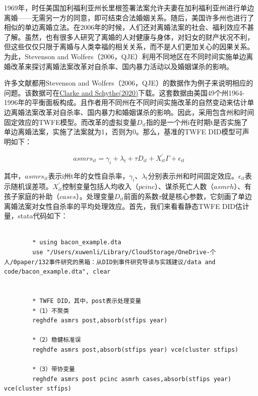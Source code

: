 \documentclass[cn,12pt,math=newtx,citestyle=gb7714-2015,bibstyle=gb7714-2015]{elegantbook}
\begin{document}
	  1969年，时任美国加利福利亚州长里根签署法案允许夫妻在加利福利亚州进行单边离婚——无需另一方的同意，即可结束合法婚姻关系。随后，美国许多州也进行了相似的单边离婚立法。在2006年的时候，人们还对离婚法案的社会、福利效应不甚了解。虽然，也有很多人研究了离婚的人对健康与身体，对妇女的财产状况不利，但这些仅仅只限于离婚与人类幸福的相关关系，而不是人们更加关心的因果关系。为此，Stevenson and Wolfers（2006，QJE）利用不同地区在不同时间实施单边离婚改革来探讨离婚法案改革对自杀率、国内暴力活动以及婚姻谋杀的影响。
	  
	  许多文献都用Stevenson and Wolfers（2006，QJE）的数据作为例子来说明相应的问题。该数据可在\href{http://www.damianclarke.net/stata/bacon_example.dta}{Clarke and Schythe(2020)}下载。这套数据由美国49个州1964-1996年的平衡面板构成。且作者用不同州在不同时间实施改革的自然变动来估计单边离婚法案改革对自杀率、国内暴力和婚姻谋杀的影响。因此，采用包含州和时间固定效应的TWFE模型。而改革的虚拟变量$D_{it}$指的是一个州i在时期t是否实施了单边离婚法案，实施了法案就为1，否则为0。那么，基准的TWFE DID模型可声明如下：
	  
	  \begin{equation}
	  	asmrs_{it}=\gamma_i+\lambda_t+\tau D_{it}+X^{'}_{it}\Gamma+\epsilon_{it}
	  \end{equation}
  
      其中，$asmrs_{it}$表示i州t年的女性自杀率，$\gamma_i、\lambda_t$分别表示州和时间固定效应。$\epsilon_{it}$表示随机误差项。$X^{'}_{it}$控制变量包括人均收入（$pcinc$）、谋杀死亡人数（$asmrh$）、有孩子家庭的补助（$cases$）。处理变量$D_{it}$前面的系数$\tau$就是核心参数，它刻画了单边离婚法案对女性自杀率的平均处理效应。首先，我们来看看静态TWFE DID估计量，stata代码如下：
      
      \begin{lstlisting}
      	
      	* using bacon_example.dta
      	use "/Users/xuwenli/Library/CloudStorage/OneDrive-个人/0paper/132事件研究的黑箱：从DID到事件研究导读与实践建议/data and code/bacon_example.dta", clear
      	
      	
      	* TWFE DID，其中，post表示处理变量
      	*（1）不聚类
      	reghdfe asmrs post,absorb(stfips year)
      	
      	*（2）稳健标准误
      	reghdfe asmrs post,absorb(stfips year) vce(cluster stfips)
      	
      	*（3）带协变量
      	reghdfe asmrs post pcinc asmrh cases,absorb(stfips year) vce(cluster stfips)
      	
      \end{lstlisting}
      
\end{document}
